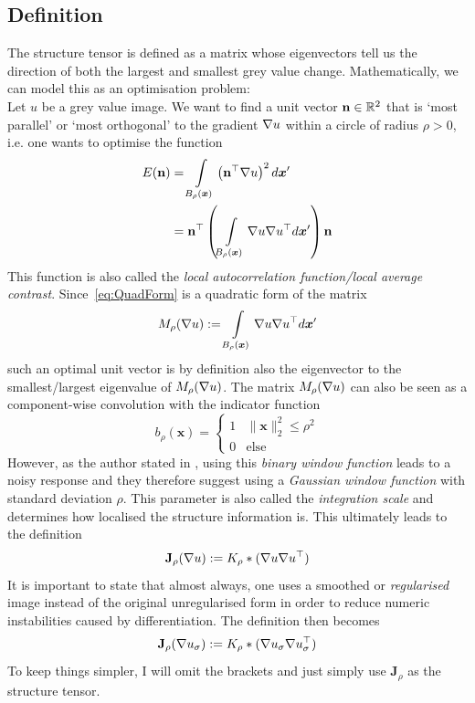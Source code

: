 \subsection{Definition}
The structure tensor is defined as a matrix whose eigenvectors tell us the direction of
both the largest and smallest grey value change. Mathematically, we can model this
as an optimisation problem:\\
Let $u$ be a grey value image.
We want to find a unit vector $\mathbf{n} \in \mathbb{R}^2$ that is `most parallel' or `most orthogonal' to the
gradient $\mathbf{\nabla} u$ within a circle of radius $\rho > 0$, i.e. one wants to optimise the
function
\begin{align}
    E(\mathbf{n}) &= \int\limits_{B_\rho(\boldsymbol x)} \left(\mathbf{n}^\top\mathbf{\nabla}
        u\right)^2d\boldsymbol x'\\
    &= \mathbf{n}^\top \left(\int\limits_{B_\rho(\boldsymbol x)} \mathbf{\nabla} u \mathbf{\nabla}
        u^\top d\boldsymbol x' \right) \mathbf{n}\label{eq:QuadForm}
\end{align}
This function is also called the \textit{local autocorrelation function/local average
    contrast}\cite{harris88, ipcv}.
Since~\eqref{eq:QuadForm} is a quadratic form of the matrix
\[M_\rho(\mathbf{\nabla} u) := \int\limits_{B_\rho(\boldsymbol x)} \mathbf{\nabla} u \mathbf{\nabla}
    u^\top d\boldsymbol x'\]
such an optimal unit vector is by definition also the eigenvector to the smallest/largest
eigenvalue of $M_\rho(\mathbf{\nabla} u)$\cite{ipcv}.
The matrix $M_\rho(\mathbf{\nabla} u)$ can also be seen as a component-wise convolution with the indicator
function
\[b_\rho(\boldsymbol x) = \begin{cases} 1 & \lVert \boldsymbol x\rVert_2^2 \leq \rho^2\\ 0 & \text{else} \end{cases}\]
However, as the author stated in \cite{harris88}, using this \textit{binary window function} leads
to a noisy response and they therefore suggest using a \textit{Gaussian window function} with standard
deviation $\rho$. This parameter is also
called the \textit{integration scale} and determines how localised the structure information
is\cite{ipcv}.
This ultimately leads to the definition
\begin{equation}
    \mathbf{J}_\rho(\mathbf{\nabla} u) := K_\rho * (\mathbf{\nabla} u\mathbf{\nabla} u^\top)
\end{equation}
It is important to state that almost always, one uses a smoothed or \textit{regularised} image instead of the
original unregularised form in order to reduce numeric instabilities caused by
differentiation\cite{ipcv}. The definition then becomes
\begin{equation}
    \mathbf{J}_\rho(\mathbf{\nabla} u_\sigma) := K_\rho * (\mathbf{\nabla} u_\sigma\mathbf{\nabla}
    u_\sigma^\top)\label{def:StructTensor}
\end{equation}
To keep things simpler, I will omit the brackets and just simply use $\mathbf{J}_\rho$ as the
structure tensor.\\
